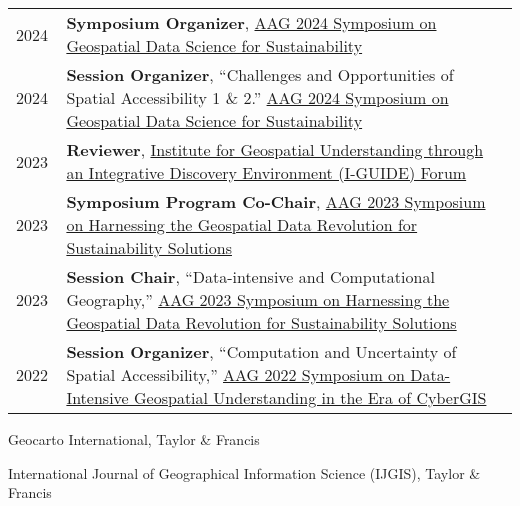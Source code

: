\documentclass{acmcv}
\begin{document}
    \begin{longtable}{p{0.1\linewidth} p{0.9\linewidth}}
        2024 & \textbf{Symposium Organizer}, \href{https://iguide.illinois.edu/aag-2024-symposium-on-geospatial-data-science-for-sustainability/}{AAG 2024 Symposium on Geospatial Data Science for Sustainability}\\

        2024 & \textbf{Session Organizer}, ``Challenges and Opportunities of Spatial Accessibility 1 \& 2.'' \href{https://iguide.illinois.edu/aag-2024-symposium-on-geospatial-data-science-for-sustainability/}{AAG 2024 Symposium on Geospatial Data Science for Sustainability}\\
        
        2023 & \textbf{Reviewer}, \href{https://iguide.illinois.edu/forum-2023/}{Institute for Geospatial Understanding through an Integrative Discovery Environment (I-GUIDE) Forum}\\

        2023 & \textbf{Symposium Program Co-Chair}, \href{https://iguide.illinois.edu/aag-2023-symposium-on-harnessing-the-geospatial-data-revolution-for-sustainability-solutions/}{AAG 2023 Symposium on Harnessing the Geospatial Data Revolution for Sustainability Solutions}\\

        2023 & \textbf{Session Chair}, ``Data-intensive and Computational Geography,'' \href{https://iguide.illinois.edu/aag-2023-symposium-on-harnessing-the-geospatial-data-revolution-for-sustainability-solutions/}{AAG 2023 Symposium on Harnessing the Geospatial Data Revolution for Sustainability Solutions}\\

        2022 & \textbf{Session Organizer}, ``Computation and Uncertainty of Spatial Accessibility,'' \href{https://cybergis.illinois.edu/aag-symposium-2022/}{AAG 2022 Symposium on Data-Intensive Geospatial Understanding in the Era of CyberGIS}\\
    \end{longtable}

    \vspace*{0.25cm}
    \begin{titemize}
        \item Geocarto International, Taylor \& Francis
        \item International Journal of Geographical Information Science (IJGIS), Taylor \& Francis
    \end{titemize}
\end{document}
